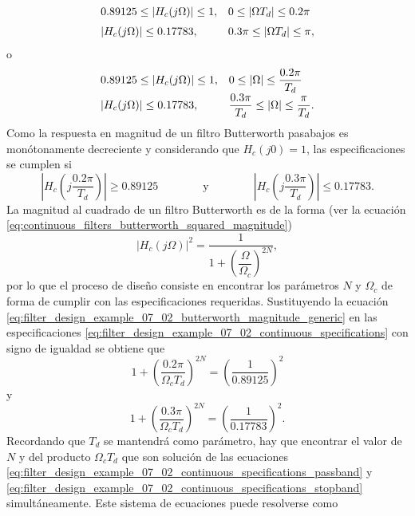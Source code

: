 \documentclass[a4paper]{report}
\begin{document}
\[
 \begin{array}{ll}
  0.89125\leq|H_c(j\Omega)|\leq1, & 0\leq|\Omega T_d|\leq0.2\pi\\[\medskipamount]
  |H_c(j\Omega)|\leq0.17783, & 0.3\pi\leq|\Omega T_d|\leq\pi,
 \end{array} 
\]
o
\begin{equation}
 \begin{array}{ll}
  0.89125\leq|H_c(j\Omega)|\leq1, & 0\leq|\Omega|\leq\dfrac{0.2\pi}{T_d}\\[\medskipamount]
  |H_c(j\Omega)|\leq0.17783, & \dfrac{0.3\pi}{T_d}\leq|\Omega|\leq\dfrac{\pi}{T_d}.
 \end{array} 
\end{equation}
Como la respuesta en magnitud de un filtro Butterworth pasabajos es monótonamente decreciente y considerando que \(H_c(j0)=1\), las especificaciones se cumplen si
\begin{equation}\label{eq:filter_design_example_07_02_continuous_specifications}
 \left|H_c\left(j\dfrac{0.2\pi}{T_d}\right)\right|\geq0.89125
 \qquad\qquad\textrm{y}\qquad\qquad
 \left|H_c\left(j\dfrac{0.3\pi}{T_d}\right)\right|\leq0.17783. 
\end{equation}
La magnitud al cuadrado de un filtro Butterworth es de la forma (ver la  ecuación \ref{eq:continuous_filters_butterworth_squared_magnitude})
\begin{equation}\label{eq:filter_design_example_07_02_butterworth_magnitude_generic}
 |H_c(j\Omega)|^2=\frac{1}{1+\left(\dfrac{\Omega}{\Omega_c}\right)^{2N}}, 
\end{equation}
por lo que el proceso de diseño consiste en encontrar los parámetros \(N\) y \(\Omega_c\) de forma de cumplir con las especificaciones requeridas. Sustituyendo la ecuación \ref{eq:filter_design_example_07_02_butterworth_magnitude_generic} en las especificaciones \ref{eq:filter_design_example_07_02_continuous_specifications} con signo de igualdad se obtiene que
\begin{equation}\label{eq:filter_design_example_07_02_continuous_specifications_passband}
 1+\left(\frac{0.2\pi}{\Omega_c T_d}\right)^{2N}=\left(\frac{1}{0.89125}\right)^2 
\end{equation}
y
\begin{equation}\label{eq:filter_design_example_07_02_continuous_specifications_stopband}
 1+\left(\frac{0.3\pi}{\Omega_c T_d}\right)^{2N}=\left(\frac{1}{0.17783}\right)^2. 
\end{equation}
Recordando que \(T_d\) se mantendrá como parámetro, hay que encontrar el valor de \(N\) y del producto \(\Omega_c T_d\) que son solución de las ecuaciones \ref{eq:filter_design_example_07_02_continuous_specifications_passband} y \ref{eq:filter_design_example_07_02_continuous_specifications_stopband} simultáneamente. Este sistema de ecuaciones puede resolverse como
\end{document}
